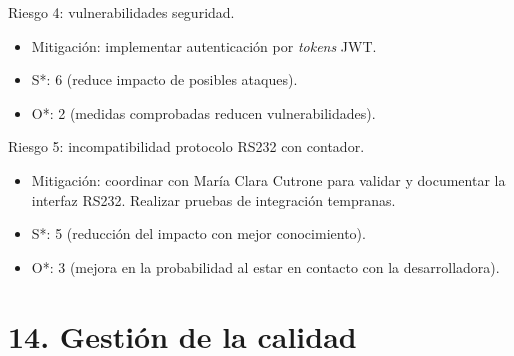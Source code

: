 \documentclass[
11pt, %
]{charter}
\begin{document}
Riesgo 4: vulnerabilidades seguridad.
\begin{itemize}
\item Mitigación: implementar autenticación por \textit{tokens} JWT.
\item S*: 6 (reduce impacto de posibles ataques).
\item O*: 2 (medidas comprobadas reducen vulnerabilidades).
\end{itemize}

Riesgo 5: incompatibilidad protocolo RS232 con contador.
\begin{itemize}
\item Mitigación: coordinar con María Clara Cutrone para validar y documentar la interfaz RS232. Realizar pruebas de integración tempranas.
\item S*: 5 (reducción del impacto con mejor conocimiento).
\item O*: 3 (mejora en la probabilidad al estar en contacto con la desarrolladora).
\end{itemize}



\section{14. Gestión de la calidad}
\label{sec:calidad}
\end{document}
